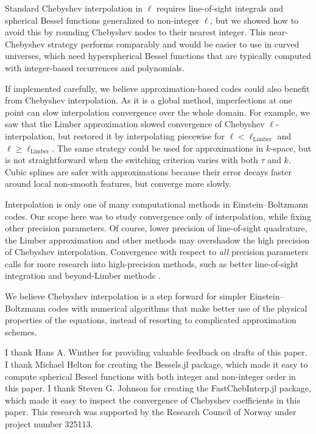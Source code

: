 \documentclass{aa}
\newcommand\EB{Einstein–Boltzmann}
\begin{document}
Standard Chebyshev interpolation in $\ell$ requires line-of-sight integrals and spherical Bessel functions generalized to non-integer $\ell$,
but we showed how to avoid this by rounding Chebyshev nodes to their nearest integer.
This near-Chebyshev strategy performs comparably and would be easier to use in curved universes,
which need hyperspherical Bessel functions that are typically computed with integer-based recurrences and polynomials.

If implemented carefully, we believe approximation-based codes could also benefit from Chebyshev interpolation.
As it is a global method,
imperfections at one point can slow interpolation convergence over the whole domain.
For example, we saw that the Limber approximation slowed convergence of Chebyshev $\ell$-interpolation,
but restored it by interpolating piecewise for $\ell < \ell_\text{Limber}$ and $\ell \geq \ell_\text{Limber}$.
The same strategy could be used for approximations in $k$-space,
but is not straightforward when the switching criterion varies with both $\tau$ and $k$.
Cubic splines are safer with approximations because their error decays faster around local non-smooth features,
but converge more slowly.

Interpolation is only one of many computational methods in \EB{} codes.
Our scope here was to study convergence only of interpolation,
while fixing other precision parameters.
Of course, lower precision of line-of-sight quadrature, the Limber approximation and other methods may overshadow the high precision of Chebyshev interpolation.
Convergence with respect to \emph{all} precision parameters calls for more research into high-precision methods,
such as better line-of-sight integration and beyond-Limber methods \citep[e.g.][]{schonebergTraditionalLineofSightApproach2018,fangLimberEfficientComputation2020,chiarenzaBLASTLimberAngular2024a,reischkePylevinEfficientNumerical2025}.

We believe Chebyshev interpolation is a step forward for simpler \EB{} codes
with numerical algorithms that make better use of the physical properties of the equations,
instead of resorting to complicated approximation schemes.

\begin{acknowledgements}
	I thank Hans A. Winther for providing valuable feedback on drafts of this paper.
	I thank Michael Helton for creating the Bessels.jl package,
	which made it easy to compute spherical Bessel functions with both integer and non-integer order in this paper.
	I thank Steven G. Johnson for creating the FastChebInterp.jl package,
	which made it easy to inspect the convergence of Chebyshev coefficients in this paper.
	This research was supported by the Research Council of Norway under project number 325113.
\end{acknowledgements}
\end{document}
